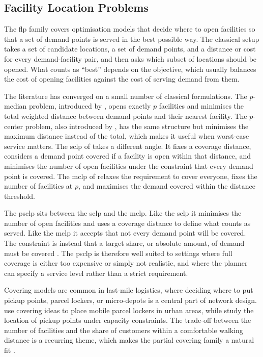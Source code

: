 \documentclass[12pt]{article}
\begin{document}
\subsection{Facility Location Problems}
\label{subsec:facility-location-problems}

The \ac{flp} family covers optimisation models that decide where to open facilities so that a set of demand points is served in the best possible way. The classical setup takes a set of candidate locations, a set of demand points, and a distance or cost for every demand-facility pair, and then asks which subset of locations should be opened. What counts as ``best'' depends on the objective, which usually balances the cost of opening facilities against the cost of serving demand from them.

The literature has converged on a small number of classical formulations. The \(p\)-median problem, introduced by \cite{hakimi1964optimum}, opens exactly \(p\) facilities and minimises the total weighted distance between demand points and their nearest facility. The \(p\)-center problem, also introduced by \cite{hakimi1965optimum}, has the same structure but minimises the maximum distance instead of the total, which makes it useful when worst-case service matters. The \ac{sclp} of \cite{toregas1971location} takes a different angle. It fixes a coverage distance, considers a demand point covered if a facility is open within that distance, and minimises the number of open facilities under the constraint that every demand point is covered. The \ac{mclp} of \cite{church1974maximal} relaxes the requirement to cover everyone, fixes the number of facilities at \(p\), and maximises the demand covered within the distance threshold.

The \ac{psclp} sits between the \ac{sclp} and the \ac{mclp}. Like the \ac{sclp} it minimises the number of open facilities and uses a coverage distance to define what counts as served. Like the \ac{mclp} it accepts that not every demand point will be covered. The constraint is instead that a target share, or absolute amount, of demand must be covered \parencite{psclp}. The \ac{psclp} is therefore well suited to settings where full coverage is either too expensive or simply not realistic, and where the planner can specify a service level rather than a strict requirement.

Covering models are common in last-mile logistics, where deciding where to put pickup points, parcel lockers, or micro-depots is a central part of network design. \cite{schwerdfeger2020optimizing} use covering ideas to place mobile parcel lockers in urban areas, while \cite{deutsch2018parcel} study the location of pickup points under capacity constraints. The trade-off between the number of facilities and the share of customers within a comfortable walking distance is a recurring theme, which makes the partial covering family a natural fit \parencite{boyer2009last}.
\end{document}
